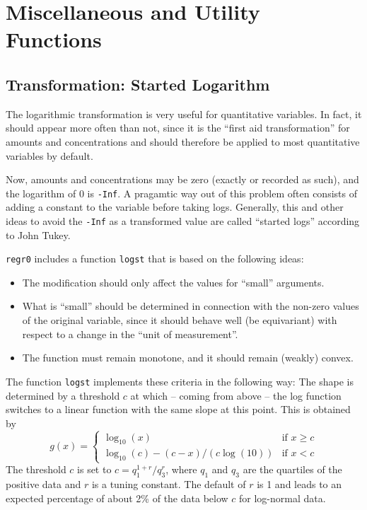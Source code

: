 \documentclass[11pt]{article}
\begin{document}
\Vneed{50mm}
\section{Miscellaneous and Utility Functions}
\subsection{Transformation: Started Logarithm}
The logarithmic transformation is very useful for quantitative variables. 
In fact, it should appear more often than not, since it is the
``first aid transformation'' for amounts and concentrations and should
therefore be applied to most quantitative variables by default.

Now, amounts and concentrations may be zero (exactly or recorded as such),
and the logarithm of 0 is \texttt{-Inf}. 
A pragamtic way out of this problem often consists of adding a constant
to the variable before taking logs. 
Generally, this and other ideas to avoid the \texttt{-Inf} as a transformed
value are called ``started logs'' according to John Tukey.

\texttt{regr0} includes a function \texttt{logst} that is based on the
following ideas:
\begin{itemize}
\item 
The modification should only affect the values for ``small'' arguments.
\item
What is ``small'' should be determined in connection with the non-zero 
values of the original variable, since it should behave well (be
equivariant) with respect to a change in the ``unit of measurement''.
\item
The function must remain monotone, and it should remain (weakly) convex.
\end{itemize}

The function \texttt{logst} implements these criteria in the following way: 
The shape is determined by a threshold $c$ at which -- coming from above --
the log function switches to a linear function with the same slope at this
point. This is obtained by
$$
  g(x) = \left\{\begin{array}{ll}\log_{10}(x) & \mbox{if\ \ } x\ge c\\
         \log_{10}(c) - (c-x)/(c\log(10)) & \mbox{if\ \ } x< c
         \end{array}\right.
$$
The threshold $c$ is set to
$ c = q_1^{1+r}/q_3^r$, where $q_1$ and $q_3$ are the quartiles of the 
positive data and $r$ is a tuning constant. 
The default of $r$ is 1 and leads to an expected
percentage of about 2\% of the data below $c$ for log-normal data.
\end{document}

